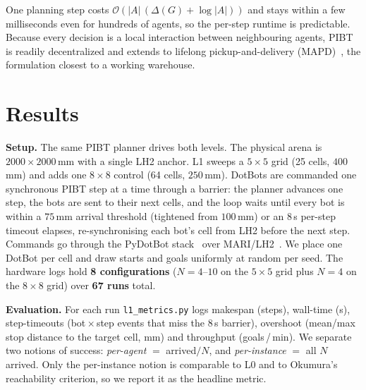 One planning step costs $\mathcal{O}\!\left(|A|\,(\Delta(G)+\log|A|)\right)$ and stays
within a few milliseconds even for hundreds of agents, so the per-step runtime is
predictable. Because every decision is a local interaction between neighbouring agents,
PIBT is readily decentralized and extends to lifelong pickup-and-delivery
(MAPD)~\cite{okumura22priority}, the formulation closest to a working warehouse.

\section{Results}
\label{sec:results}
\textbf{Setup.}
The same PIBT planner drives both levels. The physical arena is $2000\times2000$\,mm
with a single LH2 anchor. L1 sweeps a $5\times5$ grid (25 cells, $400$\,mm) and adds one
$8\times8$ control (64 cells, $250$\,mm). DotBots are commanded one synchronous PIBT step
at a time through a barrier: the planner advances one step, the bots are sent to their
next cells, and the loop waits until every bot is within a $75$\,mm arrival threshold
(tightened from $100$\,mm) or an $8$\,s per-step timeout elapses, re-synchronising each
bot's cell from LH2 before the next step. Commands go through the PyDotBot
stack~\cite{TODO:pydotbot} over MARI/LH2~\cite{alvarado24dotbot}.%
We place one DotBot per cell and draw starts and goals uniformly at random per seed. The
hardware logs hold \textbf{8 configurations} ($N=4$--$10$ on the $5\times5$ grid plus
$N=4$ on the $8\times8$ grid) over \textbf{67 runs} total.

\textbf{Evaluation.}
For each run \texttt{l1\_metrics.py} logs makespan (steps), wall-time (s), step-timeouts
(bot\,$\times$\,step events that miss the $8$\,s barrier), overshoot (mean/max stop
distance to the target cell, mm) and throughput (goals\,/\,min). We separate two notions
of success: \emph{per-agent} $=$ arrived$/N$, and \emph{per-instance} $=$ all $N$ arrived.
Only the per-instance notion is comparable to L0 and to Okumura's reachability criterion,
so we report it as the headline metric.

